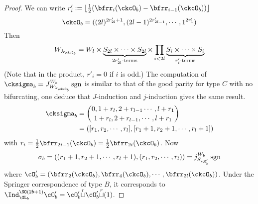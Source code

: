 \documentclass[12pt,a4paper]{amsart}
\newcommand{\sgn}{\operatorname{sgn}}
\numberwithin{equation}{section}
\theoremstyle{remark}
\def\half{{\tfrac{1}{2}}}
\def\floor#1{{\lfloor #1 \rfloor}}
\def\lamckb{\lambda_{\ckcO_b}}
\def\cuprow{{\stackrel{r}{\sqcup}}}
\begin{document}
\begin{proof}
{      We can write
      $r'_{i} := \floor{\half(\bfrr_{i}(\ckcO_{b})-\bfrr_{i-1}(\ckcO_{b}))}$
      \[
        \ckcO_{b} %
        = ((2l)^{2r'_{2l}+1}, (2l-1)^{2r'_{2l-1}},\cdots, 1^{2r'_{1}})
      \]
      Then
      \[
        W_{\lamckb} = W_{l} \times \underbrace{S_{2l}\times \cdots \times S_{2l}}_{2r'_{2l}\text{-terms}} \times \prod_{i<2l} \underbrace{S_{i}\times \cdots\times S_{i}}_{r'_{i}\text{-terms}}
      \]
      (Note that in the product, $r'_{i}=0$ if $i$ is odd.) The computation of
      $\cksigma_{b} = J_{W_{\lamckb}}^{W_{b}} \sgn$ is similar to that of the
      good parity for type $C$ with no bifurcating, one deduce that
      $J$-induction and $j$-induction gives the same result.
      \[
        \begin{split}
          \cksigma_{b} &=
          \binom{0, 1+r_{l}, 2+r_{l-1}\cdots, l+r_{1}}{1+r_{l},2+r_{l-1}, \cdots, l+r_{1}}\\
          & = ([r_{1},r_{2},\cdots, r_{l}],[r_{1}+1,r_{2}+1,\cdots,r_{l}+1])\\
        \end{split}
      \]
      with $r_{i} = \half\bfrr_{2i-1}(\ckcO_{b}) = \half\bfrr_{2i}(\ckcO_{b})$.
      Now
      \[
        \sigma_{b} = ((r_{1}+1,r_{2}+1,\cdots,r_{l}+1), (r_{1},r_{2},\cdots, r_{l})) = j_{S_{\cO'_{b}}}^{W_{b}}\sgn
      \]
      where
      $\cO'_{b}=(\bfrr_{2}(\ckcO_{b}),\bfrr_{4}(\ckcO_{b}),\cdots, \bfrr_{2l}(\ckcO_{b}))$.
      Under the Springer correspondence of type $B$, it corresponds to
      $\Ind_{\GL_{b}}^{\SO(2b+1)}\cO'_{b} = \cO'_{b}\cuprow \cO'_{b}\cuprow (1)$.



}
\end{proof}
\end{document}
